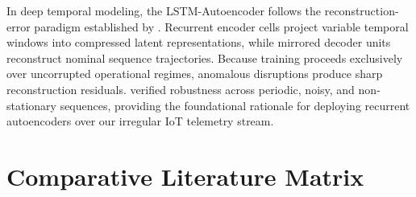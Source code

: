 \documentclass[11pt,a4paper,oneside]{report}
\begin{document}
In deep temporal modeling, the LSTM-Autoencoder follows the reconstruction-error paradigm established by \textcite{malhotra2016lstm}. Recurrent encoder cells project variable temporal windows into compressed latent representations, while mirrored decoder units reconstruct nominal sequence trajectories. Because training proceeds exclusively over uncorrupted operational regimes, anomalous disruptions produce sharp reconstruction residuals. \textcite{malhotra2016lstm} verified robustness across periodic, noisy, and non-stationary sequences, providing the foundational rationale for deploying recurrent autoencoders over our irregular IoT telemetry stream.

\section{Comparative Literature Matrix}
\label{sec:lit_matrix}
\end{document}
